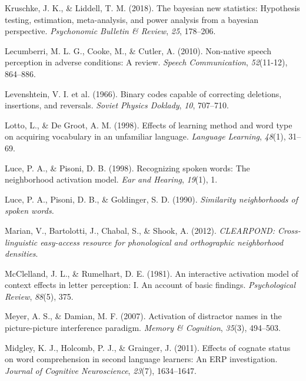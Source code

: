 \documentclass[
]{article}
\newlength{\cslhangindent}
\newenvironment{CSLReferences}[2] %
 {\begin{list}{}{%
  \setlength{\itemindent}{0pt}
  \setlength{\leftmargin}{0pt}
  \setlength{\parsep}{0pt}
  \ifodd #1
   \setlength{\leftmargin}{\cslhangindent}
   \setlength{\itemindent}{-1\cslhangindent}
  \fi
  \setlength{\itemsep}{#2\baselineskip}}}
 {\end{list}}
\begin{document}
\begin{CSLReferences}{1}{0}
Kruschke, J. K., \& Liddell, T. M. (2018). The bayesian new statistics:
Hypothesis testing, estimation, meta-analysis, and power analysis from a
bayesian perspective. \emph{Psychonomic Bulletin \& Review}, \emph{25},
178--206.

Lecumberri, M. L. G., Cooke, M., \& Cutler, A. (2010). Non-native speech
perception in adverse conditions: A review. \emph{Speech Communication},
\emph{52}(11-12), 864--886.

Levenshtein, V. I. et al. (1966). Binary codes capable of correcting
deletions, insertions, and reversals. \emph{Soviet Physics Doklady},
\emph{10}, 707--710.

Lotto, L., \& De Groot, A. M. (1998). Effects of learning method and
word type on acquiring vocabulary in an unfamiliar language.
\emph{Language Learning}, \emph{48}(1), 31--69.

Luce, P. A., \& Pisoni, D. B. (1998). Recognizing spoken words: The
neighborhood activation model. \emph{Ear and Hearing}, \emph{19}(1), 1.

Luce, P. A., Pisoni, D. B., \& Goldinger, S. D. (1990). \emph{Similarity
neighborhoods of spoken words.}

Marian, V., Bartolotti, J., Chabal, S., \& Shook, A. (2012).
\emph{CLEARPOND: Cross-linguistic easy-access resource for phonological
and orthographic neighborhood densities}.

McClelland, J. L., \& Rumelhart, D. E. (1981). An interactive activation
model of context effects in letter perception: I. An account of basic
findings. \emph{Psychological Review}, \emph{88}(5), 375.

Meyer, A. S., \& Damian, M. F. (2007). Activation of distractor names in
the picture-picture interference paradigm. \emph{Memory \& Cognition},
\emph{35}(3), 494--503.

Midgley, K. J., Holcomb, P. J., \& Grainger, J. (2011). Effects of
cognate status on word comprehension in second language learners: An ERP
investigation. \emph{Journal of Cognitive Neuroscience}, \emph{23}(7),
1634--1647.


\end{CSLReferences}
\end{document}
